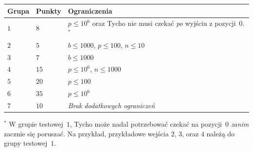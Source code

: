 \medskip
\begin{tabular}{lll}
Grupa & Punkty & Ograniczenia \\\hline
  $1$ & $8$  & $p\leq 10^6$ oraz Tycho nie musi czekać \emph{po} wyjściu z pozycji~$0$.$^*$ \\ %
  $2$ & $5$  & $b\leq 1000$, $p\leq 100$, $n\leq 10$ \\
  $3$ & $7$  & $b\leq 1000$ \\
  $4$ & $15$ & $p\leq 10^6$, $n\leq 1000$\\
  $5$ & $20$ & $p\leq 100$\\
  $6$ & $35$ & $p\leq 10^6$\\
  $7$ & $10$ & \emph{Brak dodatkowych ograniczeń}
\end{tabular}

\medskip
\noindent $^*$ W grupie testowej~$1$, Tycho może nadal potrzebować czekać na pozycji~$0$ \emph{zanim} zacznie się poruszać.
Na przykład, przykładowe wejścia $2$, $3$, oraz $4$ należą do grupy testowej~$1$.
